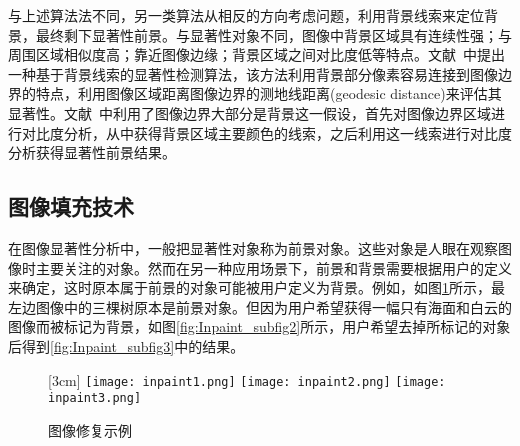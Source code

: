 与上述算法法不同，另一类算法从相反的方向考虑问题，利用背景线索来定位背景，最终剩下显著性前景。与显著性对象不同，图像中背景区域具有连续性强；与周围区域相似度高；靠近图像边缘；背景区域之间对比度低等特点。文献~\cite{geodesicDistance}中提出一种基于背景线索的显著性检测算法，该方法利用背景部分像素容易连接到图像边界的特点，利用图像区域距离图像边界的测地线距离(geodesic distance)来评估其显著性。文献~中利用了图像边界大部分是背景这一假设，首先对图像边界区域进行对比度分析，从中获得背景区域主要颜色的线索，之后利用这一线索进行对比度分析获得显著性前景结果。

\subsection{图像填充技术}
\label{sec:imageInpainting}
在图像显著性分析中，一般把显著性对象称为前景对象。这些对象是人眼在观察图像时主要关注的对象。然而在另一种应用场景下，前景和背景需要根据用户的定义来确定，这时原本属于前景的对象可能被用户定义为背景。例如，如图\ref{fig:inpainting}所示，最左边图像中的三棵树原本是前景对象。但因为用户希望获得一幅只有海面和白云的图像而被标记为背景，如图\ref{fig:Inpaint_subfig2}所示，用户希望去掉所标记的对象后得到\ref{fig:Inpaint_subfig3}中的结果。

\begin{figure}[ht]
  \centering%
  [3cm] %
    {\texttt{[image: inpaint1.png]}}%
  \hspace{4em}%
     {\texttt{[image: inpaint2.png]}}
  \hspace{1em}%
    {\texttt{[image: inpaint3.png]}}
  \caption{图像修复示例~\cite{Criminisi04regionfilling}}
  \label{fig:inpainting}
\end{figure}

